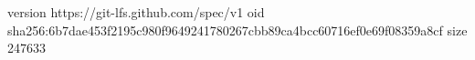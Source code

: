version https://git-lfs.github.com/spec/v1
oid sha256:6b7dae453f2195c980f9649241780267cbb89ca4bcc60716ef0e69f08359a8cf
size 247633
